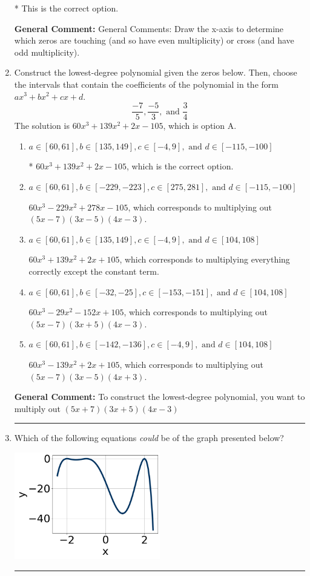 \documentclass{extbook}[14pt]
\newcommand{\litem}[1]{\item #1

\rule{\textwidth}{0.4pt}}
\begin{document}
\begin{enumerate}
{\begin{enumerate}[label=\Alph*.]
* This is the correct option.
\end{enumerate}

\textbf{General Comment:} General Comments: Draw the x-axis to determine which zeros are touching (and so have even multiplicity) or cross (and have odd multiplicity).
}
\litem{
Construct the lowest-degree polynomial given the zeros below. Then, choose the intervals that contain the coefficients of the polynomial in the form $ax^3+bx^2+cx+d$.
\[ \frac{-7}{5}, \frac{-5}{3}, \text{ and } \frac{3}{4} \]The solution is \( 60x^{3} +139 x^{2} +2 x -105 \), which is option A.\begin{enumerate}[label=\Alph*.]
\item \( a \in [60, 61], b \in [135, 149], c \in [-4, 9], \text{ and } d \in [-115, -100] \)

* $60x^{3} +139 x^{2} +2 x -105$, which is the correct option.
\item \( a \in [60, 61], b \in [-229, -223], c \in [275, 281], \text{ and } d \in [-115, -100] \)

$60x^{3} -229 x^{2} +278 x -105$, which corresponds to multiplying out $(5x -7)(3x -5)(4x -3)$.
\item \( a \in [60, 61], b \in [135, 149], c \in [-4, 9], \text{ and } d \in [104, 108] \)

$60x^{3} +139 x^{2} +2 x + 105$, which corresponds to multiplying everything correctly except the constant term.
\item \( a \in [60, 61], b \in [-32, -25], c \in [-153, -151], \text{ and } d \in [104, 108] \)

$60x^{3} -29 x^{2} -152 x + 105$, which corresponds to multiplying out $(5x -7)(3x + 5)(4x -3)$.
\item \( a \in [60, 61], b \in [-142, -136], c \in [-4, 9], \text{ and } d \in [104, 108] \)

$60x^{3} -139 x^{2} +2 x + 105$, which corresponds to multiplying out $(5x -7)(3x -5)(4x + 3)$.
\end{enumerate}

\textbf{General Comment:} To construct the lowest-degree polynomial, you want to multiply out $(5x + 7)(3x + 5)(4x -3)$
}
\litem{
Which of the following equations \textit{could} be of the graph presented below?

\begin{center}
    \includegraphics[width=0.5\textwidth]{../Figures/polyGraphToFunctionB.png}
\end{center}


}
\end{enumerate}
\end{document}
